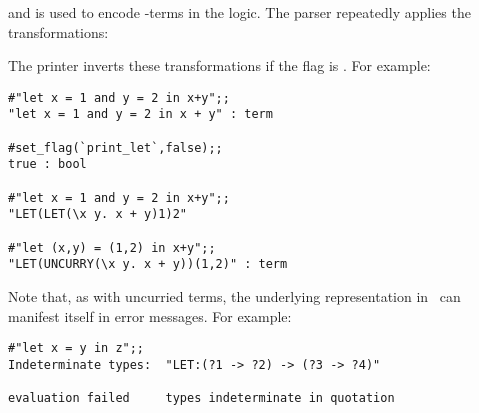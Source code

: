 \noindent and is used to encode -terms in the logic. The parser
repeatedly applies the transformations:

\bigskip

\noindent
{\small{}}

\bigskip
 

\noindent The printer inverts these transformations if the flag 
 is .  For example:

\setcounter{sessioncount}{1}
\begin{session}\begin{verbatim}
#"let x = 1 and y = 2 in x+y";;
"let x = 1 and y = 2 in x + y" : term

#set_flag(`print_let`,false);;
true : bool

#"let x = 1 and y = 2 in x+y";;
"LET(LET(\x y. x + y)1)2"

#"let (x,y) = (1,2) in x+y";;
"LET(UNCURRY(\x y. x + y))(1,2)" : term
\end{verbatim}\end{session}

Note that, as with uncurried terms, the underlying representation in \HOL\ can
manifest itself in error messages. For example:

\setcounter{sessioncount}{1}
\begin{session}\begin{verbatim}
#"let x = y in z";;
Indeterminate types:  "LET:(?1 -> ?2) -> (?3 -> ?4)"
 
evaluation failed     types indeterminate in quotation 
\end{verbatim}\end{session}

